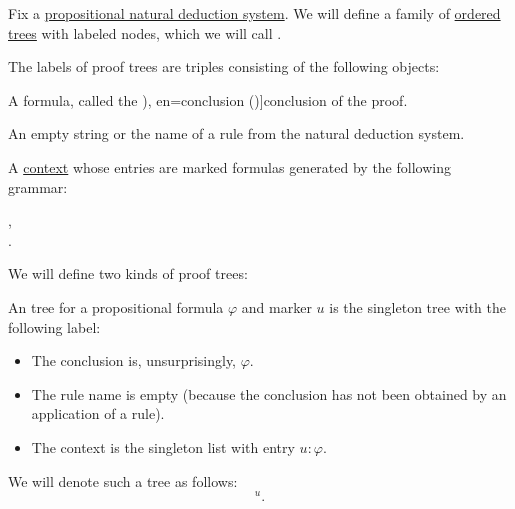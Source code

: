 \begin{definition}\label{def:natural_deduction_proof_tree}\mimprovised
  Fix a \hyperref[def:propositional_natural_deduction_system]{propositional natural deduction system}. We will define a family of \hyperref[def:ordered_tree]{ordered trees} with labeled nodes, which we will call .

  The labels of proof trees are triples consisting of the following objects:
  \begin{thmenum}[series=def:natural_deduction_proof_tree]
     A formula, called the \term[ru=conclusion (\cite[35]{TroelstraSchwichtenberg2000}), en=conclusion (\cite[36]{TroelstraSchwichtenberg2000})]{conclusion} of the proof.

     An empty string or the name of a rule from the natural deduction system.

     A \hyperref[def:logical_context]{context} whose entries are marked formulas generated by the following grammar:
    \begin{bnf*}
                {}, \\
        { \bnfsp \bnftsq{:} \bnfsp {}}.
    \end{bnf*}
  \end{thmenum}

  We will define two kinds of proof trees:
  \begin{thmenum}[resume=def:natural_deduction_proof_tree]
     An  tree for a propositional formula \( \varphi \) and marker \( u \) is the singleton tree with the following label:
    \begin{itemize}
      \item The conclusion is, unsurprisingly, \( \varphi \).
      \item The rule name is empty (because the conclusion has not been obtained by an application of a rule).
      \item The context is the singleton list with entry \( u: \varphi \).
    \end{itemize}

    We will denote such a tree as follows:
    \begin{equation*}
      [\varphi]^u.
    \end{equation*}


\end{thmenum}
\end{definition}
